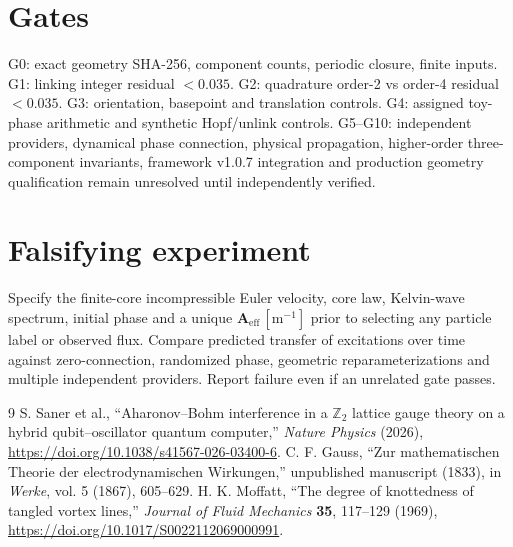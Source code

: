 \documentclass[11pt,a4paper]{article}
\begin{document}
\section{Gates}
G0: exact geometry SHA-256, component counts, periodic closure, finite inputs.
G1: linking integer residual $<0.035$. G2: quadrature order-2 vs order-4
residual $<0.035$. G3: orientation, basepoint and translation controls.
G4: assigned toy-phase arithmetic and synthetic Hopf/unlink controls.
G5--G10: independent providers, dynamical phase connection, physical propagation,
higher-order three-component invariants, framework v1.0.7 integration and
production geometry qualification remain unresolved until independently verified.
\section{Falsifying experiment}
Specify the finite-core incompressible Euler velocity, core law, Kelvin-wave
spectrum, initial phase and a unique $\mathbf A_{\mathrm{eff}}\,[\mathrm{m^{-1}}]$
prior to selecting any particle label or observed flux. Compare predicted
transfer of excitations over time against zero-connection, randomized phase,
geometric reparameterizations and multiple independent providers. Report
failure even if an unrelated gate passes.
\begin{thebibliography}{9}
 S. Saner et al., ``Aharonov--Bohm interference in a
$\mathbb Z_2$ lattice gauge theory on a hybrid qubit--oscillator quantum
computer,'' \emph{Nature Physics} (2026),
\url{https://doi.org/10.1038/s41567-026-03400-6}.
 C. F. Gauss, ``Zur mathematischen Theorie der
electrodynamischen Wirkungen,'' unpublished manuscript (1833), in
\emph{Werke}, vol. 5 (1867), 605--629.
 H. K. Moffatt, ``The degree of knottedness of tangled
vortex lines,'' \emph{Journal of Fluid Mechanics} \textbf{35}, 117--129 (1969),
\url{https://doi.org/10.1017/S0022112069000991}.
\end{thebibliography}
\end{document}
